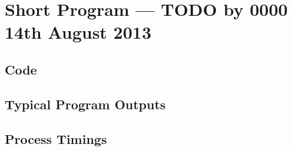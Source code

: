 \section{Short Program --- TODO by 0000 14th August 2013}

\subsection{Code}

\subsection{Typical Program Outputs}

\subsection{Process Timings}
